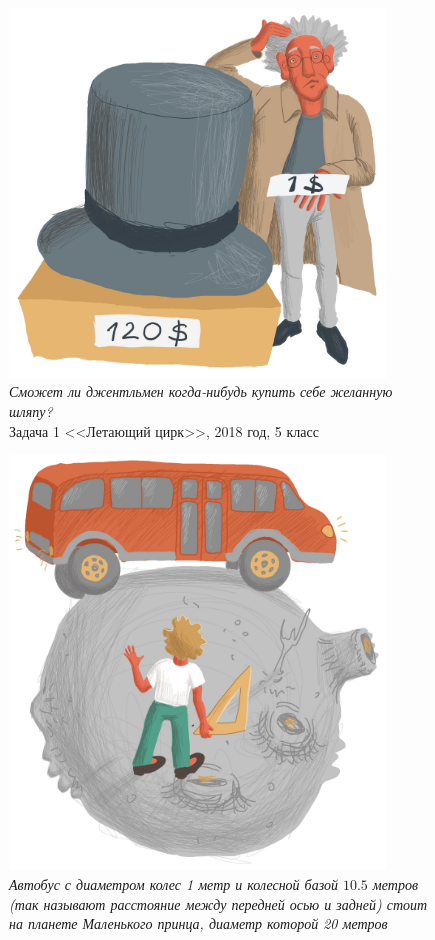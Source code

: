 \documentclass[10pt]{scrbook} \usepackage{modules/nonstahp_book}
\begin{document}
\begin{figure} \begin{center}
	\includegraphics[width=10cm]{figures/color/13c.jpg}
	\vspace{1cm}
	\caption{
             {\itshape  Сможет ли джентльмен когда-нибудь купить себе желанную шляпу? }\medskip\\
             {Задача 1 <<Летающий цирк>>, 2018 год, 5 класс}}
\end{center} \end{figure}

\begin{figure} \begin{center}
	\includegraphics[width=10cm]{figures/color/14c.jpg}
	\vspace{1cm}
	\caption{
             {\itshape  Автобус с диаметром колес 1 метр и колесной базой $10.5$ метров 
             (так называют расстояние между передней осью и задней) стоит на планете Маленького 
             принца, диаметр которой 20 метров }\medskip\\
             }
\end{center} \end{figure}
\end{document}
